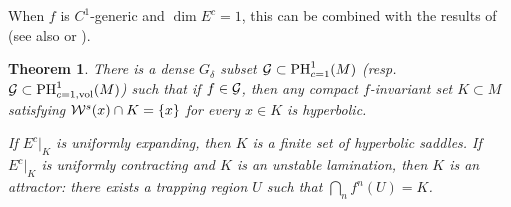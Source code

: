 \documentclass[10pt,a4paper]{amsart}
\numberwithin{equation}{section}     %
\newtheorem{teo}{Theorem}[section]
\begin{document}
When $f$ is $C^1$-generic and $\dim E^c=1$, this can be combined with the results of \cite{PS-IHP} (see also \cite[Corollary 2.31]{CP} or \cite{CPS}).


\begin{teo}\label{teo-hyp}
There is a dense $G_\delta$ subset $\mathcal{G} \subset \mathrm{PH}^1_{c=1}(M)$ (resp. $\mathcal{G} \subset \mathrm{PH}^1_{c=1,\mathrm{vol}}(M)$) such that if $f \in \mathcal{G}$, then any compact $f$-invariant set $K \subset M$ satisfying $\mathcal{W}^s(x) \cap K = \{x\}$ for every $x \in K$ is hyperbolic.

If $E^c|_{K}$ is uniformly expanding, then $K$ is a finite set of hyperbolic saddles.
If $E^c|_{K}$ is uniformly contracting and $K$ is an unstable lamination, then $K$ is
an attractor: there exists a trapping region $U$ such that $\bigcap_n f^n(U)=K$.
\end{teo}
\end{document}
